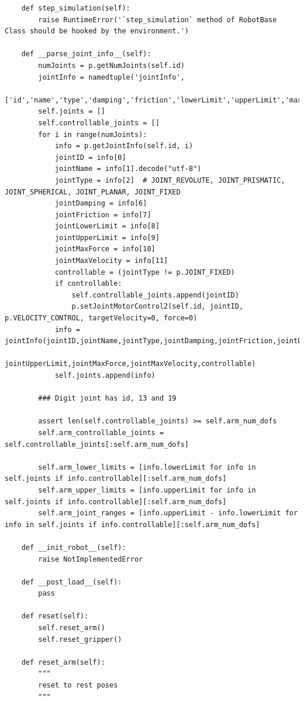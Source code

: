 \documentclass[11pt, a4paper]{report}
\begin{document}
\begin{lstlisting}
    def step_simulation(self):
        raise RuntimeError('`step_simulation` method of RobotBase Class should be hooked by the environment.')

    def __parse_joint_info__(self):
        numJoints = p.getNumJoints(self.id)
        jointInfo = namedtuple('jointInfo', 
            ['id','name','type','damping','friction','lowerLimit','upperLimit','maxForce','maxVelocity','controllable'])
        self.joints = []
        self.controllable_joints = []
        for i in range(numJoints):
            info = p.getJointInfo(self.id, i)
            jointID = info[0]
            jointName = info[1].decode("utf-8")
            jointType = info[2]  # JOINT_REVOLUTE, JOINT_PRISMATIC, JOINT_SPHERICAL, JOINT_PLANAR, JOINT_FIXED
            jointDamping = info[6]
            jointFriction = info[7]
            jointLowerLimit = info[8]
            jointUpperLimit = info[9]
            jointMaxForce = info[10]
            jointMaxVelocity = info[11]
            controllable = (jointType != p.JOINT_FIXED)
            if controllable:
                self.controllable_joints.append(jointID)
                p.setJointMotorControl2(self.id, jointID, p.VELOCITY_CONTROL, targetVelocity=0, force=0)
            info = jointInfo(jointID,jointName,jointType,jointDamping,jointFriction,jointLowerLimit,
                            jointUpperLimit,jointMaxForce,jointMaxVelocity,controllable)
            self.joints.append(info)

        ### Digit joint has id, 13 and 19

        assert len(self.controllable_joints) >= self.arm_num_dofs
        self.arm_controllable_joints = self.controllable_joints[:self.arm_num_dofs]

        self.arm_lower_limits = [info.lowerLimit for info in self.joints if info.controllable][:self.arm_num_dofs]
        self.arm_upper_limits = [info.upperLimit for info in self.joints if info.controllable][:self.arm_num_dofs]
        self.arm_joint_ranges = [info.upperLimit - info.lowerLimit for info in self.joints if info.controllable][:self.arm_num_dofs]

    def __init_robot__(self):
        raise NotImplementedError
    
    def __post_load__(self):
        pass

    def reset(self):
        self.reset_arm()
        self.reset_gripper()

    def reset_arm(self):
        """
        reset to rest poses
        """
        

\end{lstlisting}
\end{document}
